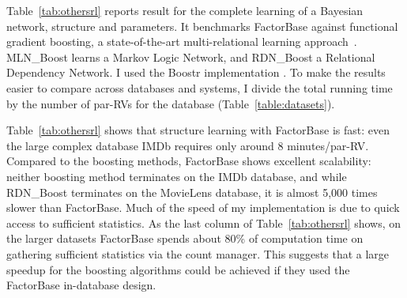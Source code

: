 \documentclass{sfuthesis}
\begin{document}
\begin{table}[!h] \caption{Learning Time Comparison (sec) with other statistical-relational learning systems. NT = non-termination}
  \centering
  \label{tab:othersrl}%
\end{table}%

Table~\ref{tab:othersrl} reports result for the complete learning of a Bayesian network, structure and parameters. It benchmarks FactorBase against functional gradient boosting, a state-of-the-art  multi-relational learning approach~\cite{Natarajan2012}. 
MLN\_Boost learns a Markov Logic Network, and RDN\_Boost a Relational Dependency Network. I  used the Boostr implementation \cite{Khot2013}. To make the results easier to compare across databases and systems, I  divide the total running time by the number of par-RVs for the database (Table~\ref{table:datasets}). 


Table~\ref{tab:othersrl} shows that structure learning with FactorBase is fast: even the large complex database IMDb requires only around 8 minutes/par-RV. Compared to the boosting methods, FactorBase  shows excellent scalability: neither boosting method terminates on the IMDb database, and while RDN\_Boost terminates on the MovieLens database, it is almost 5,000 times slower than {\sc FactorBase}. 
Much of the speed of my implementation is due to quick access to sufficient statistics. As the last column of Table~\ref{tab:othersrl} shows, on the larger datasets FactorBase spends about 80\% of computation time on gathering sufficient statistics via the count manager. This suggests that a large  speedup for the boosting algorithms could be achieved if they used the FactorBase  in-database design. 
\end{document}
